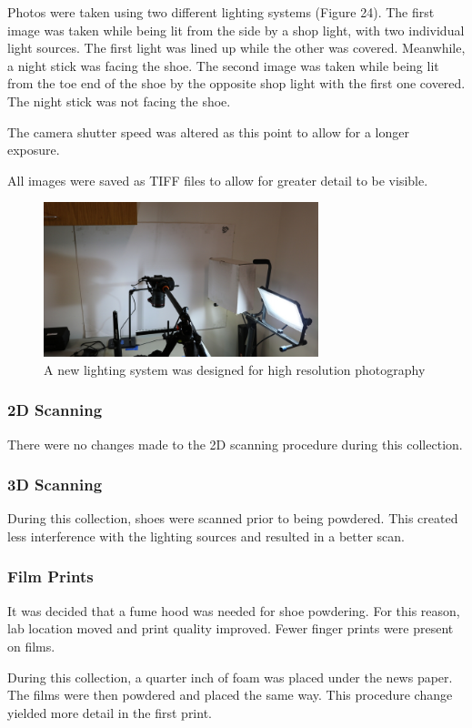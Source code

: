 Photos were taken using two different lighting systems (Figure 24). The first image was taken while being lit from the side by a shop light, with two individual light sources. The first light was lined up while the other was covered. Meanwhile, a night stick was facing the shoe. The second image was taken while being lit from the toe end of the shoe by the opposite shop light with the first one covered. The night stick was not facing the shoe. 

The camera shutter speed was altered as this point to allow for a longer exposure. 

All images were saved as TIFF files to allow for greater detail to be visible. 

\begin{figure}[!htp]
\centering
\includegraphics[width=8cm]{Camera_Lights}
\caption{A new lighting system was designed for high resolution photography}
\end{figure}

\subsubsection{2D Scanning}
There were no changes made to the 2D scanning procedure during this collection. 
\subsubsection{3D Scanning}
During this collection, shoes were scanned prior to being powdered. This created less interference with the lighting sources and resulted in a better scan. 
\subsubsection{Film Prints}
It was decided that a fume hood was needed for shoe powdering. For this reason, lab location moved and print quality improved. Fewer finger prints were present on films. 

During this collection, a quarter inch of foam was placed under the news paper. The films were then powdered and placed the same way. This procedure change yielded more detail in the first print. 

